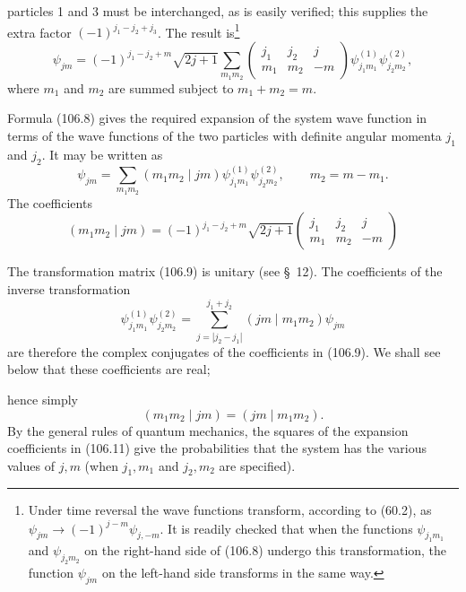 particles 1 and 3 must be interchanged, as is easily verified; this supplies the extra factor $(-1)^{j_1-j_2+j_3}$. The result is\footnote{Under time reversal the wave functions transform, according to (60.2), as $\psi_{jm}\to(-1)^{j-m}\psi_{j,-m}$. It is readily checked that when the functions $\psi_{j_1m_1}$ and $\psi_{j_2m_2}$ on the right-hand side of (106.8) undergo this transformation, the function $\psi_{jm}$ on the left-hand side transforms in the same way.}
\begin{equation}
 \psi_{jm}=(-1)^{j_1-j_2+m}\sqrt{2j+1}\sum_{m_1m_2}
 \begin{pmatrix}j_1&j_2&j\\m_1&m_2&-m\end{pmatrix}
 \psi^{(1)}_{j_1m_1}\psi^{(2)}_{j_2m_2},
 \tag{106.8}
\end{equation}
where $m_1$ and $m_2$ are summed subject to $m_1+m_2=m$.

Formula (106.8) gives the required expansion of the system wave function in terms of the wave functions of the two particles with definite angular momenta $j_1$ and $j_2$. It may be written as
\begin{equation}
 \psi_{jm}=\sum_{m_1m_2}(m_1m_2\mid jm)\psi^{(1)}_{j_1m_1}\psi^{(2)}_{j_2m_2},\qquad m_2=m-m_1.
 \tag{106.9}
\end{equation}
The coefficients
\begin{equation}
 (m_1m_2\mid jm)=(-1)^{j_1-j_2+m}\sqrt{2j+1}
 \begin{pmatrix}j_1&j_2&j\\m_1&m_2&-m\end{pmatrix}
 \tag{106.10}
\end{equation}


The transformation matrix (106.9) is unitary (see \S~12). The coefficients of the inverse transformation
\begin{equation}
 \psi^{(1)}_{j_1m_1}\psi^{(2)}_{j_2m_2}
 =\sum_{j=|j_2-j_1|}^{j_1+j_2}(jm\mid m_1m_2)\psi_{jm}
 \tag{106.11}
\end{equation}
are therefore the complex conjugates of the coefficients in (106.9). We shall see below that these coefficients are real;

hence simply
\[
 (m_1m_2\mid jm)=(jm\mid m_1m_2).
\]
By the general rules of quantum mechanics, the squares of the expansion coefficients in (106.11) give the probabilities that the system has the various values of $j,m$ (when $j_1,m_1$ and $j_2,m_2$ are specified).

